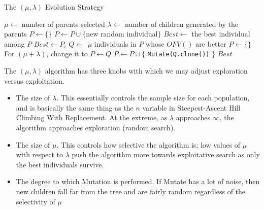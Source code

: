             \begin{algorithm}[!htp]
                \centering
                \caption{The $(\mu, \lambda)$ Evolution Strategy}
                \begin{algorithmic}[1]
                    \State $\mu \gets$ number of parents selected
                    \State $\lambda \gets$ number of children generated by the parents
                    \State $P \gets \{\}$
                        \State $P \gets P \cup \{$new random individual$\}$
                    \EndWhile
                    \State $Best \gets$ the best individual among $P$
                                \State $Best \gets P_i$
                            \EndIf
                        \EndFor
                        \State $Q \gets$ $\mu$ individuals in $P$ whose $OFV()$ are better
                        \State $P \gets \{\}$\Comment For $(\mu + \lambda)$, change it to $P \gets Q$
                                \State $P \gets P \cup \{$ \texttt{Mutate(Q.clone())} $\}$
                            \EndFor
                        \EndFor
                    \EndWhile
                    \State \Return $Best$
                \end{algorithmic}
            \end{algorithm}
            
            The $(\mu, \lambda)$ algorithm has three knobs with which we may adjust exploration versus exploitation.

            \begin{itemize}
                \item The size of $\lambda$. This essentially controls the sample size for each population, and is basically the same thing as the $n$ variable in Steepest-Ascent Hill Climbing With Replacement. At the extreme, as $\lambda$ approaches $\infty$, the algorithm approaches exploration (random search).
                \item The size of $\mu$. This controls how selective the algorithm is; low values of $\mu$ with respect to $\lambda$ push the algorithm more towards exploitative search as only the best individuals survive.
                \item The degree to which Mutation is performed. If Mutate has a lot of noise, then new children fall far from the tree and are fairly random regardless of the selectivity of $\mu$
            \end{itemize}

